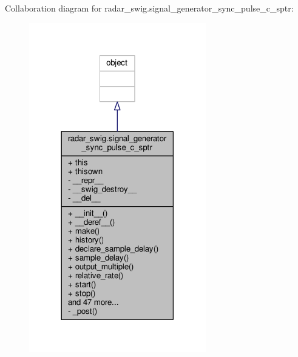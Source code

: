 Collaboration diagram for radar\+\_\+swig.\+signal\+\_\+generator\+\_\+sync\+\_\+pulse\+\_\+c\+\_\+sptr\+:
\nopagebreak
\begin{figure}[H]
\begin{center}
\leavevmode
\includegraphics[width=218pt]{d0/d12/classradar__swig_1_1signal__generator__sync__pulse__c__sptr__coll__graph}
\end{center}
\end{figure}
